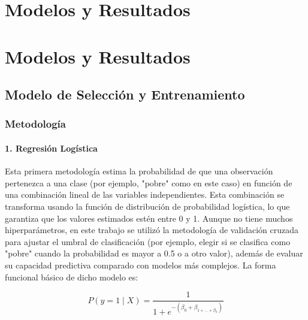 \documentclass[12pt,a4paper,onecolumn]{article}
\begin{document}

%
%

\section{Modelos y Resultados}
\section{Modelos y Resultados}
\subsection{Modelo de Selección y Entrenamiento}

\subsubsection{Metodología}

\paragraph{1. Regresión Logística}

Esta primera metodología estima la probabilidad de que una observación pertenezca a una clase (por ejemplo, "pobre" como en este caso) en función de una combinación lineal de las variables independientes. Esta combinación se transforma usando la función de distribución de probabilidad logística, lo que garantiza que los valores estimados estén entre 0 y 1. Aunque no tiene muchos hiperparámetros, en este trabajo se utilizó la metodología de validación cruzada para ajustar el umbral de clasificación (por ejemplo, elegir si se clasifica como "pobre" cuando la probabilidad es mayor a 0.5 o a otro valor), además de evaluar su capacidad predictiva comparado con modelos más complejos. La forma funcional básico de dicho modelo es:

$$P\left( y = 1 \middle| X \right) = \frac{1}{1 + e^{- (\beta_{0} + \beta_{1 + \ldots + \beta_{k}})}}$$
\end{document}
